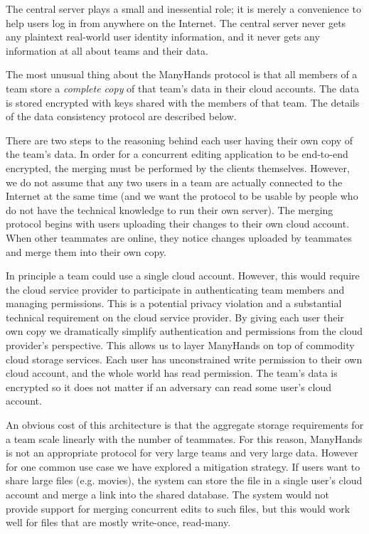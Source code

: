 \documentclass[pldi-cameraready,10pt]{sigplanconf-pldi16}
\begin{document}
The central server plays a small and inessential role; it is merely a convenience to help users log in from anywhere on the Internet.
The central server never gets any plaintext real-world user identity information, and it never gets any information at all about teams and their data.

The most unusual thing about the ManyHands protocol is that all members of a team store a \emph{complete copy} of that team's data in their cloud accounts.
The data is stored encrypted with keys shared with the members of that team.
The details of the data consistency protocol are described below.

There are two steps to the reasoning behind each user having their own copy of the team's data.
In order for a concurrent editing application to be end-to-end encrypted, the merging must be performed by the clients themselves.
However, we do not assume that any two users in a team are actually connected to the Internet at the same time (and we want the protocol to be usable by people who do not have the technical knowledge to run their own server).
The merging protocol begins with users uploading their changes to their own cloud account.
When other teammates are online, they notice changes uploaded by teammates and merge them into their own copy.

In principle a team could use a single cloud account.
However, this would require the cloud service provider to participate in authenticating team members and managing permissions.
This is a potential privacy violation and a substantial technical requirement on the cloud service provider.
By giving each user their own copy we dramatically simplify authentication and permissions from the cloud provider's perspective.
This allows us to layer ManyHands on top of commodity cloud storage services.
Each user has unconstrained write permission to their own cloud account, and the whole world has read permission.
The team's data is encrypted so it does not matter if an adversary can read some user's cloud account.

An obvious cost of this architecture is that the aggregate storage requirements for a team scale linearly with the number of teammates.
For this reason, ManyHands is not an appropriate protocol for very large teams and very large data.
However for one common use case we have explored a mitigation strategy.
If users want to share large files (e.g. movies), the system can store the file in a single user's cloud account and merge a link into the shared database.
The system would not provide support for merging concurrent edits to such files, but this would work well for files that are mostly write-once, read-many.
\end{document}
